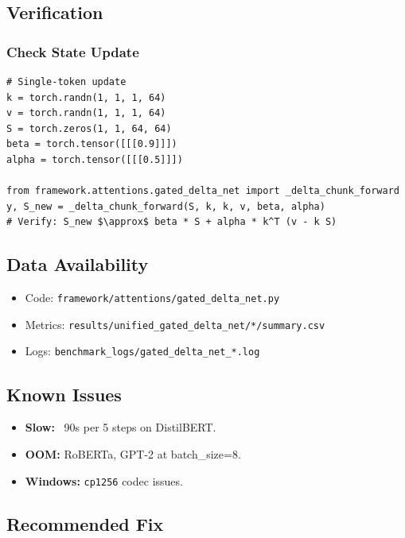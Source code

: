 \subsection{Verification}

\subsubsection{Check State Update}

\begin{lstlisting}
# Single-token update
k = torch.randn(1, 1, 1, 64)
v = torch.randn(1, 1, 1, 64)
S = torch.zeros(1, 1, 64, 64)
beta = torch.tensor([[[0.9]]])
alpha = torch.tensor([[[0.5]]])

from framework.attentions.gated_delta_net import _delta_chunk_forward
y, S_new = _delta_chunk_forward(S, k, k, v, beta, alpha)
# Verify: S_new $\approx$ beta * S + alpha * k^T (v - k S)
\end{lstlisting}

\subsection{Data Availability}

\begin{itemize}
\item Code: \texttt{framework/attentions/gated\_delta\_net.py}
\item Metrics: \texttt{results/unified\_gated\_delta\_net/*/summary.csv}
\item Logs: \texttt{benchmark\_logs/gated\_delta\_net\_*.log}

\end{itemize}
\subsection{Known Issues}

\begin{itemize}
\item \textbf{Slow:} ~90s per 5 steps on DistilBERT.
\item \textbf{OOM:} RoBERTa, GPT-2 at batch\_size=8.
\item \textbf{Windows:} \texttt{cp1256} codec issues.

\end{itemize}
\subsection{Recommended Fix}

